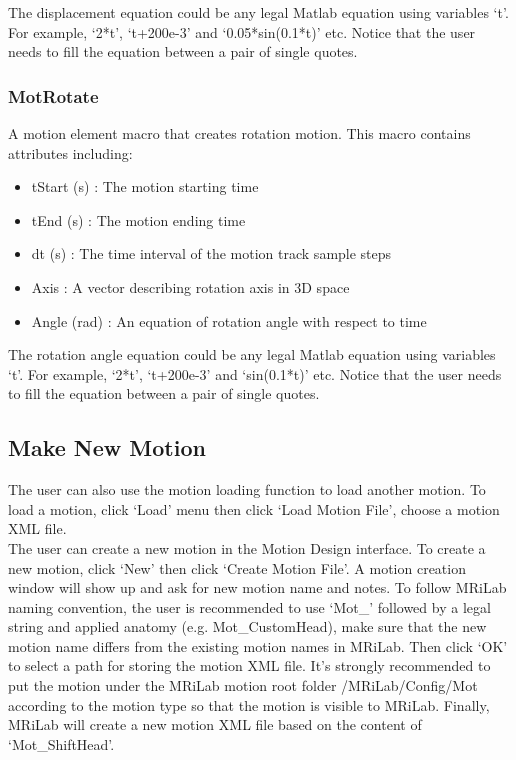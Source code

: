 \documentclass{book}%
\begin{document}
The displacement equation could be any legal Matlab equation using variables `t'. For example, `2*t', `t+200e-3' and `0.05*sin(0.1*t)' etc. Notice that the user needs to fill the equation between a pair of single quotes.


\subsubsection{MotRotate}

A motion element macro that creates rotation motion. This macro contains attributes including:

\begin{itemize}
	\item tStart (s) : The motion starting time
  \item tEnd (s) : The motion ending time
	\item dt (s) : The time interval of the motion track sample steps
	\item Axis : A vector describing rotation axis in 3D space
	\item Angle (rad) : An equation of rotation angle with respect to time
\end{itemize}

The rotation angle equation could be any legal Matlab equation using variables `t'. For example, `2*t', `t+200e-3' and `sin(0.1*t)' etc. Notice that the user needs to fill the equation between a pair of single quotes.


\subsection{Make New Motion}

The user can also use the motion loading function to load another motion. To load a motion, click `Load' menu then click `Load Motion File', choose a motion XML file.\\

The user can create a new motion in the Motion Design interface. To create a new motion, click `New' then click `Create Motion File'. A motion creation window will show up and ask for new motion name and notes. To follow MRiLab naming convention, the user is recommended to use `Mot\_' followed by a legal string and applied anatomy (e.g. Mot\_CustomHead), make sure that the new motion name differs from the existing motion names in MRiLab. Then click `OK' to select a path for storing the motion XML file. It's strongly recommended to put the motion under the MRiLab motion root folder /MRiLab/Config/Mot according to the motion type so that the motion is visible to MRiLab. Finally, MRiLab will create a new motion XML file based on the content of `Mot\_ShiftHead'. \\
\end{document}
